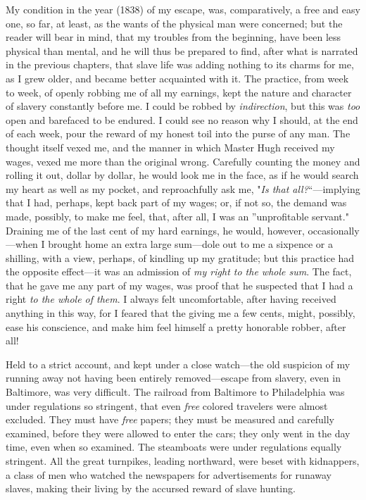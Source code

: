 My condition in the year (1838) of my escape, was, comparatively, a free
and easy one, so far, at least, as the wants of the physical man were
concerned; but the reader will bear in mind, that my troubles from the
beginning, have been less physical than mental, and he will thus be
prepared to find, after what is narrated in the previous chapters, that
slave life was adding nothing to its charms for me, as I grew older, and
became better acquainted with it. The practice, from week to week, of
openly robbing me of all my earnings, kept the nature and character of
slavery constantly before me. I could be robbed by \emph{indirection},
but this was \emph{too} open and barefaced to be endured. I could see no
reason why I should, at the end of each week, pour the reward of my
honest toil into the purse of any man. The thought itself vexed me, and
the manner in which Master Hugh received my wages, vexed me more than
the original wrong. Carefully counting the money and rolling it out,
dollar by dollar, he would look me in the face, as if he would search my
heart as well as my pocket, and reproachfully ask me, "\emph{Is that
all?}``---implying that I had, perhaps, kept back part of my wages; or,
if not so, the demand was made, possibly, to make me feel, that, after
all, I was an ''unprofitable servant." Draining me of the last cent of
my hard earnings, he would, however, occasionally---when I brought home
an extra large sum---dole out to me a sixpence or a shilling, with a
view, perhaps, of kindling up my {}gratitude; but this practice had the
opposite effect---it was an admission of \emph{my right to the whole
sum}. The fact, that he gave me any part of my wages, was proof that he
suspected that I had a right \emph{to the whole of them}. I always felt
uncomfortable, after having received anything in this way, for I feared
that the giving me a few cents, might, possibly, ease his conscience,
and make him feel himself a pretty honorable robber, after all!

Held to a strict account, and kept under a close watch---the old
suspicion of my running away not having been entirely removed---escape
from slavery, even in Baltimore, was very difficult. The railroad from
Baltimore to Philadelphia was under regulations so stringent, that even
\emph{free} colored travelers were almost excluded. They must have
\emph{free} papers; they must be measured and carefully examined, before
they were allowed to enter the cars; they only went in the day time,
even when so examined. The steamboats were under regulations equally
stringent. All the great turnpikes, leading northward, were beset with
kidnappers, a class of men who watched the newspapers for advertisements
for runaway slaves, making their living by the accursed reward of slave
hunting.

